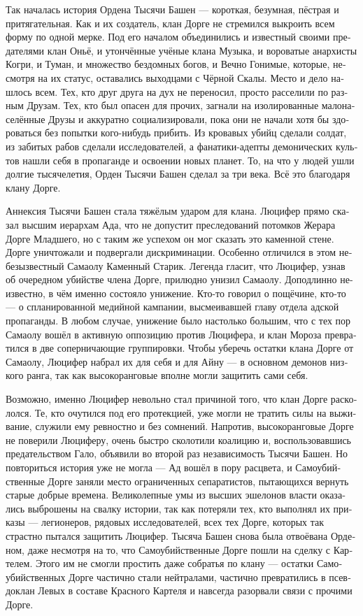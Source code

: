 \documentclass[a4paper,12pt,fleqn]{book}\usepackage{polyglossia}\setdefaultlanguage[babelshorthands=true]{russian}\setotherlanguage{english}\defaultfontfeatures{Ligatures=TeX,Mapping=tex-text}\usepackage{xcolor}\newcommand{\ml}[3]{#2}
\begin{document}
{Так началась история Ордена Тысячи Башен --- короткая, безумная, пёстрая и притягательная.
Как и их создатель, клан Дорге не стремился выкроить всем форму по одной мерке.
Под его началом объединились и известный своими предателями клан Оньё, и утончённые учёные клана Музыка, и вороватые анархисты Когри, и Туман, и множество бездомных богов, и Вечно Гонимые, которые, несмотря на их статус, оставались выходцами с Чёрной Скалы.
Место и дело нашлось всем.
Тех, кто друг друга на дух не переносил, просто расселили по разным Друзам.
Тех, кто был опасен для прочих, загнали на изолированные малонаселённые Друзы и аккуратно социализировали, пока они не начали хотя бы здороваться без попытки кого-нибудь прибить.
Из кровавых убийц сделали солдат, из забитых рабов сделали исследователей, а фанатики-адепты демонических культов нашли себя в пропаганде и освоении новых планет.
То, на что у людей ушли долгие тысячелетия, Орден Тысячи Башен сделал за три века.
Всё это благодаря клану Дорге.

Аннексия Тысячи Башен стала тяжёлым ударом для клана.
Люцифер прямо сказал высшим иерархам Ада, что не допустит преследований потомков Жерара Дорге Младшего, но с таким же успехом он мог сказать это каменной стене.
Дорге уничтожали и подвергали дискриминации.
Особенно отличился в этом небезызвестный Самаолу Каменный Старик.
Легенда гласит, что Люцифер, узнав об очередном убийстве члена Дорге, прилюдно унизил Самаолу.
Доподлинно неизвестно, в чём именно состояло унижение.
Кто-то говорил о пощёчине, кто-то --- о спланированной медийной кампании, высмеивавшей главу отдела адской пропаганды.
В любом случае, унижение было настолько большим, что с тех пор Самаолу вошёл в активную оппозицию против Люцифера, и клан Мороза превратился в две соперничающие группировки.
Чтобы уберечь остатки клана Дорге от Самаолу, Люцифер набрал их для себя и для Айну --- в основном демонов низкого ранга, так как высокоранговые вполне могли защитить сами себя.

Возможно, именно Люцифер невольно стал причиной того, что клан Дорге раскололся.
Те, кто очутился под его протекцией, уже могли не тратить силы на выживание, служили ему ревностно и без сомнений.
Напротив, высокоранговые Дорге не поверили Люциферу, очень быстро сколотили коалицию и, воспользовавшись предательством Гало, объявили во второй раз независимость Тысячи Башен.
Но повториться история уже не могла --- Ад вошёл в пору расцвета, и Самоубийственные Дорге заняли место ограниченных сепаратистов, пытающихся вернуть старые добрые времена.
Великолепные умы из высших эшелонов власти оказались выброшены на свалку истории, так как потеряли тех, кто выполнял их приказы --- легионеров, рядовых исследователей, всех тех Дорге, которых так страстно пытался защитить Люцифер.
Тысяча Башен снова была отвоёвана Орденом, даже несмотря на то, что Самоубийственные Дорге пошли на сделку с Картелем.
Этого им не смогли простить даже собратья по клану --- остатки Самоубийственных Дорге частично стали нейтралами, частично превратились в псевдоклан Левых в составе Красного Картеля и навсегда разорвали связи с прочими Дорге.

}
\end{document}
